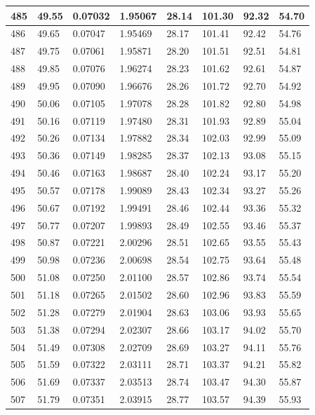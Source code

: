 \documentclass[12pt,a4paper,twoside]{article}
\begin{document}
\begin{center}
\begin{longtable}{l l l l | l l l l}
485 & 49.55 & 0.07032 & 1.95067 & 28.14 & 101.30 & 92.32 & 54.70 \\ \hline
486 & 49.65 & 0.07047 & 1.95469 & 28.17 & 101.41 & 92.42 & 54.76 \\ \hline
487 & 49.75 & 0.07061 & 1.95871 & 28.20 & 101.51 & 92.51 & 54.81 \\ \hline
488 & 49.85 & 0.07076 & 1.96274 & 28.23 & 101.62 & 92.61 & 54.87 \\ \hline
489 & 49.95 & 0.07090 & 1.96676 & 28.26 & 101.72 & 92.70 & 54.92 \\ \hline
490 & 50.06 & 0.07105 & 1.97078 & 28.28 & 101.82 & 92.80 & 54.98 \\ \hline
491 & 50.16 & 0.07119 & 1.97480 & 28.31 & 101.93 & 92.89 & 55.04 \\ \hline
492 & 50.26 & 0.07134 & 1.97882 & 28.34 & 102.03 & 92.99 & 55.09 \\ \hline
493 & 50.36 & 0.07149 & 1.98285 & 28.37 & 102.13 & 93.08 & 55.15 \\ \hline
494 & 50.46 & 0.07163 & 1.98687 & 28.40 & 102.24 & 93.17 & 55.20 \\ \hline
495 & 50.57 & 0.07178 & 1.99089 & 28.43 & 102.34 & 93.27 & 55.26 \\ \hline
496 & 50.67 & 0.07192 & 1.99491 & 28.46 & 102.44 & 93.36 & 55.32 \\ \hline
497 & 50.77 & 0.07207 & 1.99893 & 28.49 & 102.55 & 93.46 & 55.37 \\ \hline
498 & 50.87 & 0.07221 & 2.00296 & 28.51 & 102.65 & 93.55 & 55.43 \\ \hline
499 & 50.98 & 0.07236 & 2.00698 & 28.54 & 102.75 & 93.64 & 55.48 \\ \hline
500 & 51.08 & 0.07250 & 2.01100 & 28.57 & 102.86 & 93.74 & 55.54 \\ \hline
501 & 51.18 & 0.07265 & 2.01502 & 28.60 & 102.96 & 93.83 & 55.59 \\ \hline
502 & 51.28 & 0.07279 & 2.01904 & 28.63 & 103.06 & 93.93 & 55.65 \\ \hline
503 & 51.38 & 0.07294 & 2.02307 & 28.66 & 103.17 & 94.02 & 55.70 \\ \hline
504 & 51.49 & 0.07308 & 2.02709 & 28.69 & 103.27 & 94.11 & 55.76 \\ \hline
505 & 51.59 & 0.07322 & 2.03111 & 28.71 & 103.37 & 94.21 & 55.82 \\ \hline
506 & 51.69 & 0.07337 & 2.03513 & 28.74 & 103.47 & 94.30 & 55.87 \\ \hline
507 & 51.79 & 0.07351 & 2.03915 & 28.77 & 103.57 & 94.39 & 55.93 \\ \hline

\end{longtable}
\end{center}
\end{document}
